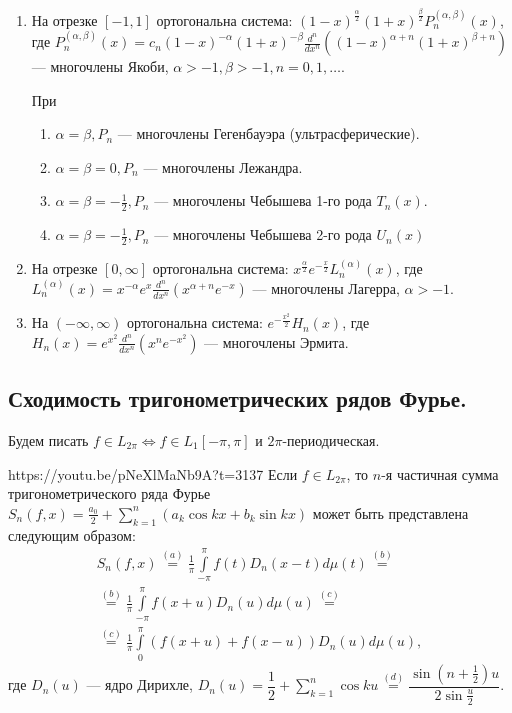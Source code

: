 \begin{enumerate}
	\item На отрезке $[-1,1]$ ортогональна система: $(1-x)^{\frac{\alpha}{2}}(1+x)^{\frac{\beta}{2}}P_n^{(\alpha,\beta)}(x)$,\\где $P_n^{(\alpha,\beta)}(x)=c_n(1-x)^{-\alpha}(1+x)^{-\beta} \frac{d^n}{dx^n}\left((1-x)^{\alpha+n}(1+x)^{\beta+n}\right)$ --- многочлены Якоби, $\alpha>-1, \beta>-1, n=0,1,\ldots$.
	
	При 
	\begin{enumerate}
		\item $\alpha=\beta, P_n$ --- многочлены Гегенбауэра (ультрасферические).
		\item $\alpha=\beta=0, P_n$ --- многочлены Лежандра.
		\item $\alpha=\beta=-\frac{1}{2}, P_n$ --- многочлены Чебышева 1-го рода $T_n(x)$.
		\item $\alpha=\beta=-\frac{1}{2}, P_n$ --- многочлены Чебышева 2-го рода $U_n(x)$
	\end{enumerate}
	\item На отрезке $[0,\infty]$ ортогональна система: $x^{\frac{\alpha}{2}}e^{-\frac{x}{2}}L_n^{(\alpha)}(x)$, где $L_n^{(\alpha)}(x)=x^{-\alpha}e^x\frac{d^n}{dx^n}\left(x^{\alpha+n}e^{-x}\right)$ --- многочлены Лагерра, $\alpha>-1$.
	\item На $(-\infty,\infty)$ ортогональна система: $e^{-\frac{x^2}{2}}H_n(x)$, где $H_n(x)=e^{x^2}\frac{d^n}{dx^n}(x^ne^{-x^2})$ --- многочлены Эрмита.
\end{enumerate}

\subsection{Сходимость тригонометрических рядов Фурье.}

Будем писать $f\in L_{2\pi}\Leftrightarrow f\in L_1[-\pi,\pi]$ и $2\pi$-периодическая. 
\begin{linklm}{https://youtu.be/pNeXlMaNb9A?t=3137}
	Если \label{lemma_12.2.1}$f\in L_{2\pi}$, то $n$-я частичная сумма тригонометрического ряда Фурье $S_n(f,x)=\frac{a_0}{2}+\sum\limits_{k=1}^n(a_k\cos kx+b_k\sin kx)$ может быть представлена следующим образом:
	\begin{multline*}
		S_n(f,x)\overset{(a)}{=}\frac{1}{\pi}\int\limits_{-\pi}^\pi f(t)D_n(x-t)d\mu(t)\overset{(b)}{=}\\ \overset{(b)}{=}\frac{1}{\pi}\int\limits_{-\pi}^\pi f(x+u)D_n(u)d\mu(u)\overset{(c)}{=}\\ \overset{(c)}{=}\frac{1}{\pi}\int\limits_{0}^\pi(f(x+u)+f(x-u))D_n(u)d\mu(u),
	\end{multline*} 
где $D_n(u)$ --- ядро Дирихле, $D_n(u)=\dfrac{1}{2}+\sum\limits_{k=1}^n \cos ku\overset{(d)}{=}\dfrac{\sin(n+\frac{1}{2})u}{2\sin\frac{u}{2}}$. 
\end{linklm}

